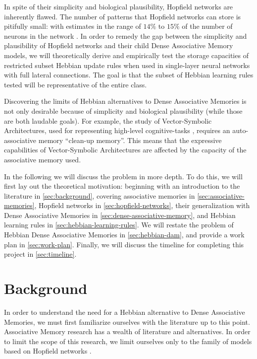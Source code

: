 \documentclass{article}
\theoremstyle{definition}
\begin{document}
In spite of their simplicity and biological plausibility, Hopfield networks
are inherently flawed. The number of patterns that Hopfield networks
can store is pitifully small: with estimates in the range of $14\%$ to $15\%$
of the number of neurons in the network
\parencites{hopfield_neural_1982,amit_statistical_1987}.
In order to remedy the gap between the simplicity and plausibility of
Hopfield networks
and their child Dense Associative Memory models, we will theoretically derive
and empirically test the storage capacities of restricted subset
Hebbian update rules
when used in single-layer neural networks with full lateral
connections. The goal
is that the subset of Hebbian learning rules tested will be representative of
the entire class.

Discovering the limits of Hebbian alternatives to Dense Associative Memories
is not only desirable because of simplicity and biological plausibility
(while those are both laudable goals). For example, the study of
Vector-Symbolic Architectures, used for representing high-level cognitive-tasks
\parencites{smolensky_tensor_1990,plate_holographic_1995,gayler_multiplicative_1998},
requires an auto-associative memory ``clean-up memory''. This means that
the expressive capabilities of Vector-Symbolic Architectures are
affected by the capacity of the associative memory used.

In the following we will discuss the problem in more depth. To do
this, we will first
lay out the theoretical motivation: beginning with an introduction to
the literature
in \autoref{sec:background}, covering associative memories in
\autoref{sec:associative-memories},
Hopfield networks in \autoref{sec:hopfield-networks}, their generalization with
Dense Associative Memories in \autoref{sec:dense-associative-memory},
and Hebbian learning rules in \autoref{sec:hebbian-learning-rules}.
We will restate the
problem of Hebbian Dense Associative Memories in \autoref{sec:hebbian-dam}, and
provide a work plan in \autoref{sec:work-plan}. Finally, we will discuss
the timeline for completing this project in \autoref{sec:timeline}.

\section{Background}\label{sec:background}

In order to understand the need for a Hebbian alternative to Dense Associative
Memories, we must first familiarize ourselves with the literature up to this
point. Associative Memory research has a wealth of literature and alternatives.
In order to limit the scope of this research, we limit ourselves only to the
family of models based on Hopfield networks \parencite{hopfield_neural_1982}.
\end{document}

